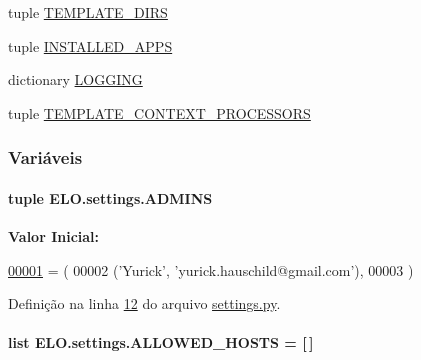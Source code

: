 \begin{DoxyCompactItemize}
tuple \hyperlink{namespaceELO_1_1settings_a4e977a41e98923ee4c93b24d22b3d7e2}{T\-E\-M\-P\-L\-A\-T\-E\-\_\-\-D\-I\-R\-S}
\item 
tuple \hyperlink{namespaceELO_1_1settings_a1a4752075da59d93477195bcc3fc4765}{I\-N\-S\-T\-A\-L\-L\-E\-D\-\_\-\-A\-P\-P\-S}
\item 
dictionary \hyperlink{namespaceELO_1_1settings_addc421e02af1569796e2d33b2bc62ff5}{L\-O\-G\-G\-I\-N\-G}
\item 
tuple \hyperlink{namespaceELO_1_1settings_ad62b51880946e9380913c2f3811311bf}{T\-E\-M\-P\-L\-A\-T\-E\-\_\-\-C\-O\-N\-T\-E\-X\-T\-\_\-\-P\-R\-O\-C\-E\-S\-S\-O\-R\-S}
\end{DoxyCompactItemize}


\subsubsection{Variáveis}
\hypertarget{namespaceELO_1_1settings_a051220bd8105ba13b2720df11c1950ba}{
\paragraph[{A\-D\-M\-I\-N\-S}]{\setlength{\rightskip}{0pt plus 5cm}tuple E\-L\-O.\-settings.\-A\-D\-M\-I\-N\-S}}\label{namespaceELO_1_1settings_a051220bd8105ba13b2720df11c1950ba}
{\bfseries Valor Inicial\-:}
\begin{DoxyCode}
\hypertarget{namespaceELO_1_1settings_l00001}{}\hyperlink{namespaceELO_1_1settings}{00001} = (
00002     (\textcolor{stringliteral}{'Yurick'}, \textcolor{stringliteral}{'yurick.hauschild@gmail.com'}),
00003 )
\end{DoxyCode}


Definição na linha \hyperlink{settings_8py_source_l00012}{12} do arquivo \hyperlink{settings_8py_source}{settings.\-py}.

\hypertarget{namespaceELO_1_1settings_afd72644768367440ae1a89e9fe95cde5}{
\paragraph[{A\-L\-L\-O\-W\-E\-D\-\_\-\-H\-O\-S\-T\-S}]{\setlength{\rightskip}{0pt plus 5cm}list E\-L\-O.\-settings.\-A\-L\-L\-O\-W\-E\-D\-\_\-\-H\-O\-S\-T\-S = \mbox{[}$\,$\mbox{]}}}\label{namespaceELO_1_1settings_afd72644768367440ae1a89e9fe95cde5}


